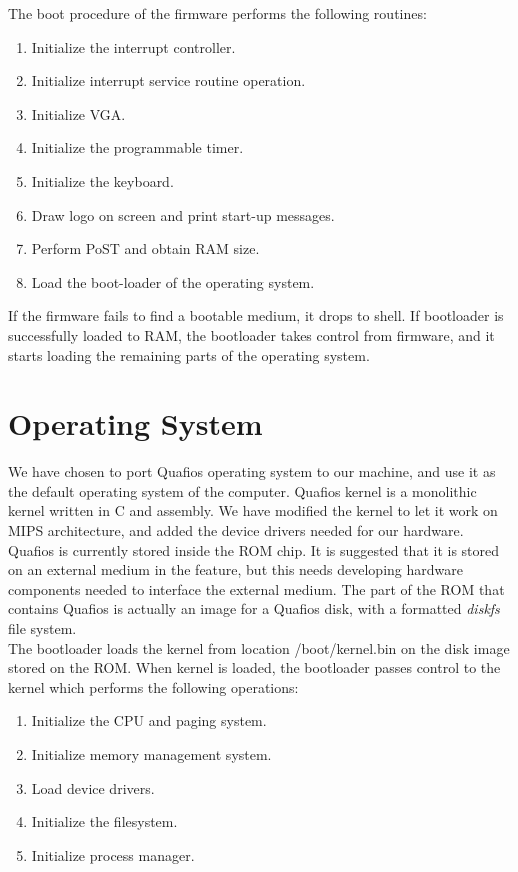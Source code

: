 \documentclass[oneside]{book}
\begin{document}
The boot procedure of the firmware performs the following routines:

\begin{enumerate}
\item Initialize the interrupt controller.
\item Initialize interrupt service routine operation.
\item Initialize VGA.
\item Initialize the programmable timer.
\item Initialize the keyboard.
\item Draw logo on screen and print start-up messages.
\item Perform PoST and obtain RAM size.
\item Load the boot-loader of the operating system.
\end{enumerate}

If the firmware fails to find a bootable medium, it drops to shell. If
bootloader is successfully loaded to RAM, the bootloader takes control
from firmware, and it starts loading the remaining parts of the operating
system.

\section{Operating System}

We have chosen to port Quafios operating system to our machine, and use it
as the default operating system of the computer. Quafios kernel is a
monolithic kernel written in C and assembly. We have modified the kernel to
let it work on MIPS architecture, and added the device drivers needed
for our hardware.\\

Quafios is currently stored inside the ROM chip. It is suggested that
it is stored on an external medium in the feature, but this needs developing
hardware components needed to interface the external medium. The part
of the ROM that contains Quafios is actually an image for a Quafios disk,
with a formatted \textit{diskfs} file system.\\

The bootloader loads the kernel from location /boot/kernel.bin on the disk
image stored on the ROM. When kernel is loaded, the bootloader passes
control to the kernel which performs the following operations:

\begin{enumerate}

\item Initialize the CPU and paging system.
\item Initialize memory management system.
\item Load device drivers.
\item Initialize the filesystem.
\item Initialize process manager.

\end{enumerate}
\end{document}
